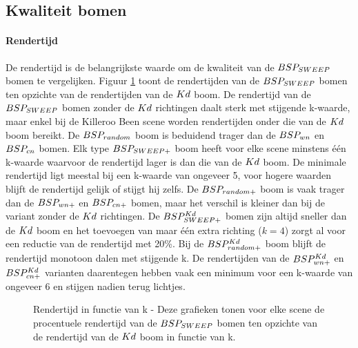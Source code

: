 \subsection{Kwaliteit bomen}
\label{h5-richtingen-kwaliteit}
\paragraph{Rendertijd}
De rendertijd is de belangrijkste waarde om de kwaliteit van de $BSP_{SWEEP}$ bomen te vergelijken. Figuur \ref{fig:k-rendertijd} toont de rendertijden van de $BSP_{SWEEP}$ bomen ten opzichte van de rendertijden van de $Kd$ boom.
De rendertijd van de $BSP_{SWEEP}$ bomen zonder de $Kd$ richtingen daalt sterk met stijgende k-waarde, maar enkel bij de Killeroo Been scene worden rendertijden onder die van de $Kd$ boom bereikt.
De $BSP_{random}$ boom is beduidend trager dan de $BSP_{wn}$ en $BSP_{cn}$ bomen.
Elk type $BSP_{SWEEP+}$ boom heeft voor elke scene minstens één k-waarde waarvoor de rendertijd lager is dan die van de $Kd$ boom.
De minimale rendertijd ligt meestal bij een k-waarde van ongeveer 5, voor hogere waarden blijft de rendertijd gelijk of stijgt hij zelfs.
De $BSP_{random+}$ boom is vaak trager dan de $BSP_{wn+}$ en $BSP_{cn+}$ bomen, maar het verschil is kleiner dan bij de variant zonder de $Kd$ richtingen.
De $BSP^{Kd}_{SWEEP+}$ bomen zijn altijd sneller dan de $Kd$ boom en het toevoegen van maar één extra richting ($k = 4$) zorgt al voor een reductie van de rendertijd met 20\%.
Bij de $BSP^{Kd}_{random+}$ boom blijft de rendertijd monotoon dalen met stijgende k.
De rendertijden van de $BSP^{Kd}_{wn+}$ en $BSP^{Kd}_{cn+}$ varianten daarentegen hebben vaak een minimum voor een k-waarde van ongeveer 6 en stijgen nadien terug lichtjes.
\begin{figure}
  \centering
  \begin{subfigure}[t]{.32\linewidth}
    \centering
{}
  \end{subfigure}
  \begin{subfigure}[t]{.32\linewidth}
    \centering
{}
\end{subfigure}
\begin{subfigure}[t]{.32\linewidth}
  \centering
{}
\end{subfigure}
\caption[Rendertijd in functie van k]{Rendertijd in functie van k - \small Deze grafieken tonen voor elke scene de procentuele rendertijd van de $BSP_{SWEEP}$ bomen ten opzichte van de rendertijd van de $Kd$ boom in functie van k.}
\label{fig:k-rendertijd}
\end{figure}

